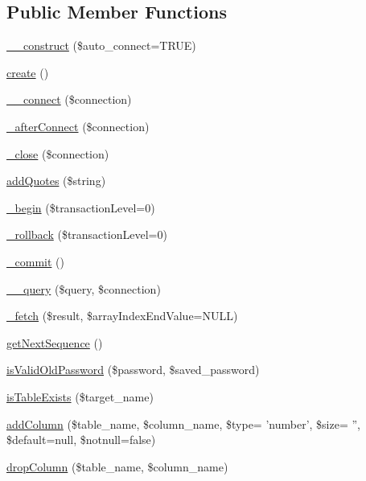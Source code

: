 \subsection*{Public Member Functions}
\begin{DoxyCompactItemize}
\item 
\hyperlink{classDBMysql_a45db599596d807efc1f8ccac68b8a698}{\-\_\-\-\_\-construct} (\$auto\-\_\-connect=T\-R\-U\-E)
\item 
\hyperlink{classDBMysql_a58ab5c56561966d486ba54129aed954d}{create} ()
\item 
\hyperlink{classDBMysql_ad11061c47d57c2f346947e0789ecb46b}{\-\_\-\-\_\-connect} (\$connection)
\item 
\hyperlink{classDBMysql_a660e94bc5cde26859bb95cc428ca92da}{\-\_\-after\-Connect} (\$connection)
\item 
\hyperlink{classDBMysql_a59581237e4dcb5f91f63de2459248e13}{\-\_\-close} (\$connection)
\item 
\hyperlink{classDBMysql_a9674193c36272fa9ea16c20d91cfbfe5}{add\-Quotes} (\$string)
\item 
\hyperlink{classDBMysql_a60dec65d2138fed25d0331e498972df8}{\-\_\-begin} (\$transaction\-Level=0)
\item 
\hyperlink{classDBMysql_af146dafdfc0dd7ce0f04427ac371a1ea}{\-\_\-rollback} (\$transaction\-Level=0)
\item 
\hyperlink{classDBMysql_a3f720677af37c36b2bc2934dd358a477}{\-\_\-commit} ()
\item 
\hyperlink{classDBMysql_aa33da673a8c415b641b4e0b5209d3453}{\-\_\-\-\_\-query} (\$query, \$connection)
\item 
\hyperlink{classDBMysql_a4c7d83d8dcbb8e65c8fdfe75fa7d9fa5}{\-\_\-fetch} (\$result, \$array\-Index\-End\-Value=N\-U\-L\-L)
\item 
\hyperlink{classDBMysql_a926ea6ca10e71ae128be90604b78411f}{get\-Next\-Sequence} ()
\item 
\hyperlink{classDBMysql_a19020f1ece293bcc332400234ee95dea}{is\-Valid\-Old\-Password} (\$password, \$saved\-\_\-password)
\item 
\hyperlink{classDBMysql_a095f2a64a070958c18cb3ebfab3043e5}{is\-Table\-Exists} (\$target\-\_\-name)
\item 
\hyperlink{classDBMysql_ab9f9ee7573485e7767c1dd7dd54cead0}{add\-Column} (\$table\-\_\-name, \$column\-\_\-name, \$type= 'number', \$size= '', \$default=null, \$notnull=false)
\item 
\hyperlink{classDBMysql_aa4cd80d663225f3cd7a539d7d7101b38}{drop\-Column} (\$table\-\_\-name, \$column\-\_\-name)

\end{DoxyCompactItemize}
